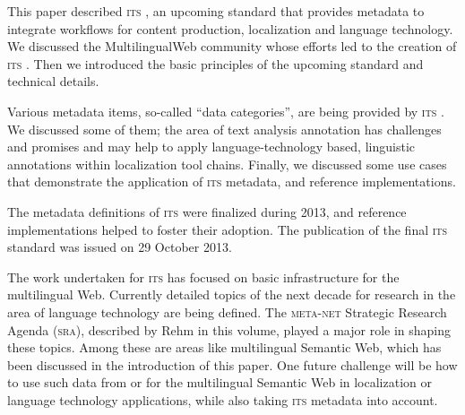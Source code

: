\documentclass[output=paper]{LSP/langsci}
\begin{document}
This paper described \textsc{its }, an upcoming standard that provides metadata to integrate workflows for content production, localization and language technology. We discussed the MultilingualWeb community whose efforts led to the creation of \textsc{its }. Then we introduced the basic principles of the upcoming standard and technical details.

Various metadata items, so-called ``data categories'', are being provided by \textsc{its }. We discussed some of them; the area of text analysis annotation has challenges and promises and may help to apply language-technology based, linguistic annotations within localization tool chains. Finally, we discussed some use cases that demonstrate the application of \textsc{its } metadata, and reference implementations.

The metadata definitions of \textsc{its } were finalized during 2013, and reference implementations helped to foster their adoption. The publication of the final \textsc{its } standard was issued on 29 October 2013.  

The work undertaken for \textsc{its } has focused on basic infrastructure for the multilingual Web. Currently detailed topics of the next decade for research in the area of language technology are being defined. The \textsc{meta-net} Strategic Research Agenda (\textsc{sra}), described by Rehm in this volume, played a major role in shaping these topics. Among these are areas like multilingual Semantic Web, which has been discussed in the introduction of this paper. One future challenge will be how to use such data from or for the multilingual Semantic Web in localization or language technology applications, while also taking \textsc{its } metadata into account.

\printbibliography[heading=subbibliography,notkeyword=this]
\end{document}
